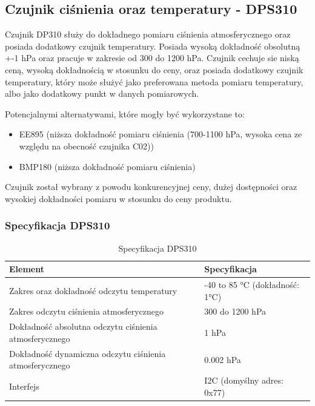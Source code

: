 \documentclass[12pt,a4paper]{article}
\begin{document}
\subsection{Czujnik ciśnienia oraz temperatury - DPS310}

Czujnik DP310 służy do dokładnego pomiaru ciśnienia atmosferycznego oraz posiada dodatkowy czujnik temperatury. Posiada wysoką dokładność obsolutną +-1 hPa oraz pracuje w zakresie od 300 do 1200 hPa. Czujnik cechuje sie niską ceną, wysoką dokładnością w stosunku do ceny, oraz posiada dodatkowy czujnik temperatury, który może służyć jako preferowana metoda pomiaru temperatury, albo jako dodatkowy punkt w danych pomiarowych.

Potencjalnymi alternatywami, które mogły być wykorzystane to:
\begin{itemize}
    \item EE895 (niższa dokładność pomiaru ciśnienia (700-1100 hPa, wysoka cena ze względu na obecność czujnika C02))
    \item BMP180 (niższa dokładność pomiaru ciśnienia)
\end{itemize}

Czujnik został wybrany z powodu konkurencyjnej ceny, dużej dostępności oraz wysokiej dokładności pomiaru w stosunku do ceny produktu.

\subsubsection{Specyfikacja DPS310}

\begin{table}[H]
    \centering
    \begin{tabular}{|l|l|}
        \hline
        Element & Specyfikacja \\
        \hline
        Zakres oraz dokładność odczytu temperatury & -40 to 85 °C (dokładność: 1°C) \\
        \hline
        Zakres odczytu ciśnienia atmosferycznego & 300 do 1200 hPa \\
        \hline
        Dokładność absolutna odczytu ciśnienia atmosferycznego & 1 hPa \\
        \hline
        Dokładność dynamiczna odczytu ciśnienia atmosferycznego & 0.002 hPa \\
        \hline
        Interfejs & I2C (domyślny adres: 0x77) \\
        \hline
    \end{tabular}
    \caption{Specyfikacja DPS310}
    \label{dps310-spec}
\end{table}
\end{document}
